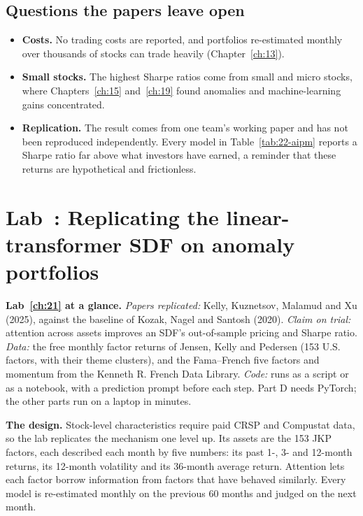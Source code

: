 \subsection{Questions the papers leave open}

\begin{itemize}
  \item \textbf{Costs.} No trading costs are reported, and portfolios re-estimated monthly over thousands of stocks can trade heavily (Chapter~\ref{ch:13}).
  \item \textbf{Small stocks.} The highest Sharpe ratios come from small and micro stocks, where Chapters~\ref{ch:15} and~\ref{ch:19} found anomalies and machine-learning gains concentrated.
  \item \textbf{Replication.} The result comes from one team's working paper and has not been reproduced independently. Every model in Table~\ref{tab:22-aipm} reports a Sharpe ratio far above what investors have earned, a reminder that these returns are hypothetical and frictionless.
\end{itemize}

\section{Lab~\thechapter: Replicating the linear-transformer SDF on anomaly portfolios}
\label{sec:22-lab}

\begin{callout}
\textbf{Lab~\ref{ch:21} at a glance.} \emph{Papers replicated:} Kelly, Kuznetsov, Malamud and Xu (2025), against the baseline of Kozak, Nagel and Santosh (2020). \emph{Claim on trial:} attention across assets improves an SDF's out-of-sample pricing and Sharpe ratio. \emph{Data:} the free monthly factor returns of Jensen, Kelly and Pedersen (153 U.S. factors, with their theme clusters), and the Fama--French five factors and momentum from the Kenneth R. French Data Library. \emph{Code:} runs as a script or as a notebook, with a prediction prompt before each step. Part D needs PyTorch; the other parts run on a laptop in minutes.
\end{callout}

\textbf{The design.} Stock-level characteristics require paid CRSP and Compustat data, so the lab replicates the mechanism one level up. Its assets are the 153 JKP factors, each described each month by five numbers: its past 1-, 3- and 12-month returns, its 12-month volatility and its 36-month average return. Attention lets each factor borrow information from factors that have behaved similarly. Every model is re-estimated monthly on the previous 60 months and judged on the next month.

